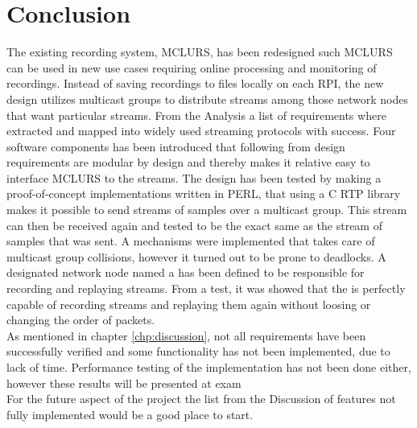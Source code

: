 \chapter{Conclusion}
The existing recording system, MCLURS, has been redesigned such MCLURS can be used in new use cases requiring online processing and monitoring of recordings. Instead of saving recordings to files locally on each RPI, the new design utilizes multicast groups to distribute streams among those network nodes that want particular streams. From the Analysis a list of requirements where extracted and mapped into widely used streaming protocols with success. Four software components has been introduced that following from design requirements are modular by design and thereby makes it relative easy to interface MCLURS to the streams. The design has been tested by making a proof-of-concept implementations written in PERL, that using a C RTP library makes it possible to send streams of samples over a multicast group. This stream can then be received again and tested to be the exact same as the stream of samples that was sent. A mechanisms were implemented that takes care of multicast group collisions, however it turned out to be prone to deadlocks. A designated network node named a \hist{} has been defined to be responsible for recording and replaying streams. From a test, it was showed that the \hist{} is perfectly capable of recording streams and replaying them again without loosing or changing the order of packets. \\

\noindent{}As mentioned in chapter \ref{chp:discussion}, not all requirements have been successfully verified and some functionality has not been implemented, due to lack of time. Performance testing of the implementation has not been done either, however these results will be presented at exam\\

\noindent{} For the future aspect of the project the list from the Discussion of features not fully implemented would be a good place to start. 